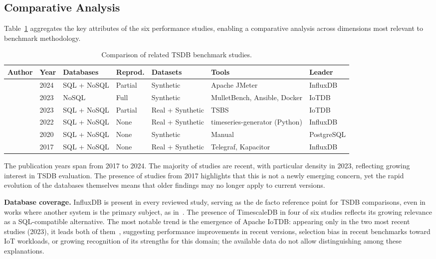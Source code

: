 \subsection{Comparative Analysis}

Table~\ref{tab:related} aggregates the key attributes of the six performance studies, enabling
a comparative analysis across dimensions most relevant to benchmark methodology.

\begin{table}[t]
  \centering
  \footnotesize
  \caption{Comparison of related TSDB benchmark studies.}
  \label{tab:related}
  \begin{tabular}{lllllll}
    \hline
    \textbf{Author} & \textbf{Year} & \textbf{Databases} & \textbf{Reprod.} & \textbf{Datasets} & \textbf{Tools} & \textbf{Leader} \\
    \hline
    \cite{lima2024avaliando}       & 2024 & SQL + NoSQL & Partial & Synthetic          & Apache JMeter                 & InfluxDB \\
    \cite{pereira2023mulletbench}  & 2023 & NoSQL       & Full    & Synthetic          & MulletBench, Ansible, Docker  & IoTDB    \\
    \cite{wang2023iotdb}           & 2023 & SQL + NoSQL & Partial & Real + Synthetic   & TSBS                          & IoTDB    \\
    \cite{shah2022performance}     & 2022 & SQL + NoSQL & None    & Real + Synthetic   & timeseries-generator (Python) & InfluxDB \\
    \cite{grzesik2020comparative}  & 2020 & SQL + NoSQL & None    & Synthetic          & Manual                        & PostgreSQL \\
    \cite{naqvi2017influxdb}       & 2017 & SQL + NoSQL & None    & Real + Synthetic   & Telegraf, Kapacitor            & InfluxDB \\
    \hline
  \end{tabular}
\end{table}

The publication years span from 2017 to 2024. The majority of studies are recent, with
particular density in 2023, reflecting growing interest in TSDB evaluation. The presence of
studies from 2017 highlights that this is not a newly emerging concern, yet the rapid evolution
of the databases themselves means that older findings may no longer apply to current versions.

\textbf{Database coverage.} InfluxDB is present in every reviewed study, serving as the de
facto reference point for TSDB comparisons, even in works where another system is the
primary subject, as in~\cite{wang2023iotdb}. The presence of TimescaleDB in four of six
studies reflects its growing relevance as a SQL-compatible alternative. The most notable
trend is the emergence of Apache IoTDB: appearing only in the two most recent studies
(2023), it leads both of them~\citep{pereira2023mulletbench,wang2023iotdb}, suggesting performance improvements in recent versions, selection bias in recent benchmarks
toward IoT workloads, or growing recognition of its strengths for this domain; the
available data do not allow distinguishing among these explanations.


